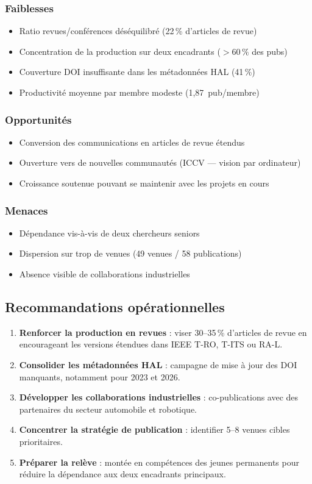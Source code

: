 \documentclass[a4paper,11pt]{article}
\begin{document}
\subsubsection{Faiblesses}
\begin{itemize}[nosep]
  \item Ratio revues/conférences déséquilibré (22\,\% d'articles de revue)
  \item Concentration de la production sur deux encadrants ($>60\,\%$ des pubs)
  \item Couverture DOI insuffisante dans les métadonnées HAL (41\,\%)
  \item Productivité moyenne par membre modeste (1,87~pub/membre)
\end{itemize}

\subsubsection{Opportunités}
\begin{itemize}[nosep]
  \item Conversion des communications en articles de revue étendus
  \item Ouverture vers de nouvelles communautés (ICCV --- vision par ordinateur)
  \item Croissance soutenue pouvant se maintenir avec les projets en cours
\end{itemize}

\subsubsection{Menaces}
\begin{itemize}[nosep]
  \item Dépendance vis-à-vis de deux chercheurs seniors
  \item Dispersion sur trop de venues (49 venues / 58 publications)
  \item Absence visible de collaborations industrielles
\end{itemize}

\subsection{Recommandations opérationnelles}

\begin{enumerate}
  \item \textbf{Renforcer la production en revues} : viser 30--35\,\% d'articles de revue en encourageant les versions étendues dans IEEE T-RO, T-ITS ou RA-L.
  \item \textbf{Consolider les métadonnées HAL} : campagne de mise à jour des DOI manquants, notamment pour 2023 et 2026.
  \item \textbf{Développer les collaborations industrielles} : co-publications avec des partenaires du secteur automobile et robotique.
  \item \textbf{Concentrer la stratégie de publication} : identifier 5--8 venues cibles prioritaires.
  \item \textbf{Préparer la relève} : montée en compétences des jeunes permanents pour réduire la dépendance aux deux encadrants principaux.
\end{enumerate}
\end{document}
